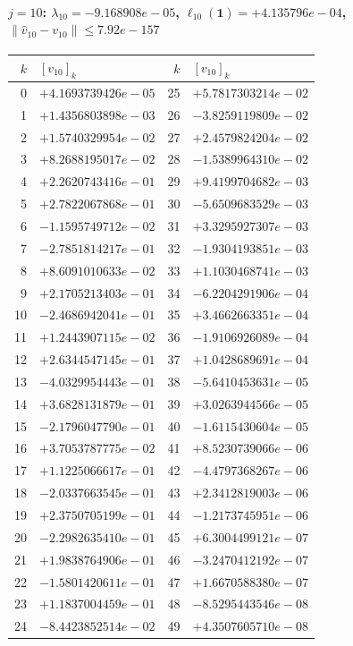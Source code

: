 \documentclass[11pt]{article}
\begin{document}
\paragraph{$j = 10$: $\lambda_{10} = -9.168908e-05$, \quad $\ell_{10}(\mathbf{1}) = +4.135796e-04$, \quad $\|\hat v_{10} - v_{10}\| \leq 7.92e-157$}
\begin{center}
{\footnotesize
\begin{tabular}{r@{\;\;}l@{\quad}r@{\;\;}l}
\toprule
$k$ & $[v_{10}]_k$ & $k$ & $[v_{10}]_k$ \\
\midrule
0 & $+4.1693739426e-05$ & 25 & $+5.7817303214e-02$ \\
1 & $+1.4356803898e-03$ & 26 & $-3.8259119809e-02$ \\
2 & $+1.5740329954e-02$ & 27 & $+2.4579824204e-02$ \\
3 & $+8.2688195017e-02$ & 28 & $-1.5389964310e-02$ \\
4 & $+2.2620743416e-01$ & 29 & $+9.4199704682e-03$ \\
5 & $+2.7822067868e-01$ & 30 & $-5.6509683529e-03$ \\
6 & $-1.1595749712e-02$ & 31 & $+3.3295927307e-03$ \\
7 & $-2.7851814217e-01$ & 32 & $-1.9304193851e-03$ \\
8 & $+8.6091010633e-02$ & 33 & $+1.1030468741e-03$ \\
9 & $+2.1705213403e-01$ & 34 & $-6.2204291906e-04$ \\
10 & $-2.4686942041e-01$ & 35 & $+3.4662663351e-04$ \\
11 & $+1.2443907115e-02$ & 36 & $-1.9106926089e-04$ \\
12 & $+2.6344547145e-01$ & 37 & $+1.0428689691e-04$ \\
13 & $-4.0329954443e-01$ & 38 & $-5.6410453631e-05$ \\
14 & $+3.6828131879e-01$ & 39 & $+3.0263944566e-05$ \\
15 & $-2.1796047790e-01$ & 40 & $-1.6115430604e-05$ \\
16 & $+3.7053787775e-02$ & 41 & $+8.5230739066e-06$ \\
17 & $+1.1225066617e-01$ & 42 & $-4.4797368267e-06$ \\
18 & $-2.0337663545e-01$ & 43 & $+2.3412819003e-06$ \\
19 & $+2.3750705199e-01$ & 44 & $-1.2173745951e-06$ \\
20 & $-2.2982635410e-01$ & 45 & $+6.3004499121e-07$ \\
21 & $+1.9838764906e-01$ & 46 & $-3.2470412192e-07$ \\
22 & $-1.5801420611e-01$ & 47 & $+1.6670588380e-07$ \\
23 & $+1.1837004459e-01$ & 48 & $-8.5295443546e-08$ \\
24 & $-8.4423852514e-02$ & 49 & $+4.3507605710e-08$ \\
\bottomrule
\end{tabular}
}
\end{center}
\end{document}
